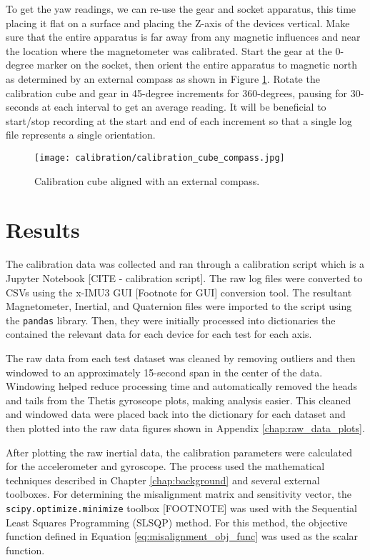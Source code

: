 To get the yaw readings, we can re-use the gear and socket apparatus, this time placing it flat on a surface and placing the Z-axis of the devices vertical.
Make sure that the entire apparatus is far away from any magnetic influences and near the location where the magnetometer was calibrated.
Start the gear at the 0-degree marker on the socket, then orient the entire apparatus to magnetic north as determined by an external compass as shown in Figure \ref{fig:calibration_cube_compass}.
Rotate the calibration cube and gear in 45-degree increments for 360-degrees, pausing for 30-seconds at each interval to get an average reading.
It will be beneficial to start/stop recording at the start and end of each increment so that a single log file represents a single orientation.

\begin{figure}[h!]
    \centering
    \texttt{[image: calibration/calibration\_cube\_compass.jpg]}
    \caption{Calibration cube aligned with an external compass.}
    \label{fig:calibration_cube_compass}
\end{figure}

\section{Results} \label{sec:calibration_results}
The calibration data was collected and ran through a calibration script which is a Jupyter Notebook [CITE - calibration script].
The raw log files were converted to CSVs using the x-IMU3 GUI [Footnote for GUI] conversion tool.
The resultant Magnetometer, Inertial, and Quaternion files were imported to the script using the \lstinline[style=customInline]|pandas| library.
Then, they were initially processed into dictionaries the contained the relevant data for each device for each test for each axis.

The raw data from each test dataset was cleaned by removing outliers and then windowed to an approximately 15-second span in the center of the data.
Windowing helped reduce processing time and automatically removed the heads and tails from the Thetis gyroscope plots, making analysis easier.
This cleaned and windowed data were placed back into the dictionary for each dataset and then plotted into the raw data figures shown in Appendix \ref{chap:raw_data_plots}.

After plotting the raw inertial data, the calibration parameters were calculated for the accelerometer and gyroscope.
The process used the mathematical techniques described in Chapter \ref{chap:background} and several external toolboxes.
For determining the misalignment matrix and sensitivity vector, the \lstinline[style=customInline]|scipy.optimize.minimize| toolbox [FOOTNOTE] was used with the Sequential Least Squares Programming (SLSQP) method.
For this method, the objective function defined in Equation \ref{eq:misalignment_obj_func} was used as the scalar function.

